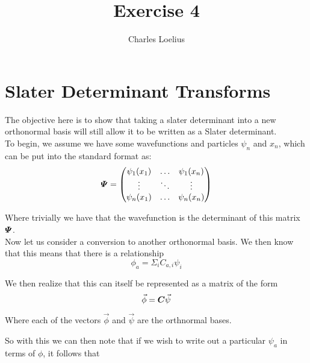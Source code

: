 \documentclass[11pt]{article} %
\title{Exercise 4}
\author{Charles Loelius}
\begin{document}
\maketitle

\section{Slater Determinant Transforms}

The objective here is to show that taking a slater determinant into a new orthonormal basis will still allow it to be written as a Slater determinant.\\


To begin, we assume we have some wavefunctions and particles $\psi_n$ and $x_n$, which can be put into the standard format as:\\

\begin{equation}
\matrixsym{\Psi}=\left( \begin{matrix} \psi_1(x_1) & \ldots & \psi_1(x_n) \\ \vdots & \ddots & \vdots \\ \psi_n(x_1) & \ldots & \psi_n(x_n)  \end{matrix}\right)
\end{equation}

Where trivially we have that the wavefunction is the determinant of this matrix $\matrixsym{\Psi}$.\\


Now let us consider a conversion to another orthonormal basis. We then know that this means that there is a relationship\\

\begin{equation}
\phi_a=\Sigma_i C_{a, i}\psi_i
\end{equation}

We then realize that this can itself be represented as a matrix of the form\\

\begin{equation}
\vec{\phi}=\matrixsym{C}\vec{\psi}
\end{equation}

Where each of the vectors $\vec{\phi}$ and $\vec{\psi}$ are the orthnormal bases.

So with this we can then note that if we wish to write out a particular $\psi_a$ in terms of $\phi$, it follows that\\
\end{document}
